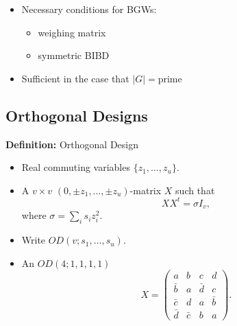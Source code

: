\documentclass{beamer}
\newcommand{\abs}[1]{|#1|}
\begin{document}

\begin{frame}

  \begin{itemize}
  \item Necessary conditions for BGWs:
    \begin{itemize}
    \item weighing matrix
    \item symmetric BIBD
    \end{itemize}
  \item Sufficient in the case that $\abs{G} = \text{prime}$ \cite[][]{lam-leung}
  \end{itemize}

\end{frame}


\subsection{Orthogonal Designs}

\begin{frame}

  \begin{block}{{\bf Definition:} Orthogonal Design}
    \begin{itemize}
    \item Real commuting variables $\{z_1, \dots, z_u\}$.
    \item A $v \times v$ $(0,\pm z_1, \dots, \pm z_u)$-matrix $X$ such that
      \[
        XX^t = \sigma I_v,
      \]
      where $\sigma = \sum_i s_iz_i^2$.
    \item Write $OD(v; s_1, \dots, s_u)$.
    \end{itemize}
  \end{block}
  
\end{frame}

\begin{frame}

  \begin{itemize}
  \item An $OD(4;1,1,1,1)$
    \[
      X = 
      \begin{pmatrix}
        a & b & c & d \\
        \bar b & a & \bar d & c \\
        \bar c & d & a & \bar b \\
        \bar d & \bar c & b & a
      \end{pmatrix}.
    \]
  \end{itemize}
  
\end{frame}
\end{document}
